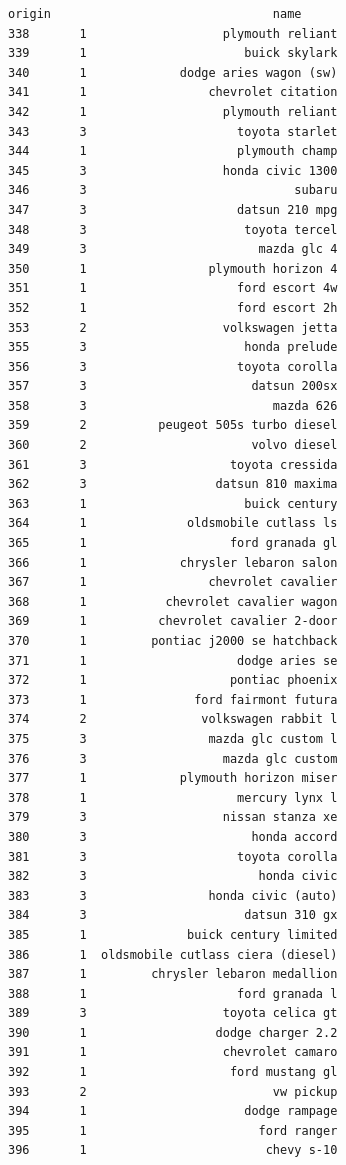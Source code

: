 \documentclass[11pt]{article}
\begin{document}
\begin{tcolorbox}[breakable, size=fbox, boxrule=.5pt, pad at break*=1mm, opacityfill=0]
\begin{Verbatim}[commandchars=\\\{\}]
     origin                               name
338       1                   plymouth reliant
339       1                      buick skylark
340       1             dodge aries wagon (sw)
341       1                 chevrolet citation
342       1                   plymouth reliant
343       3                     toyota starlet
344       1                     plymouth champ
345       3                   honda civic 1300
346       3                             subaru
347       3                     datsun 210 mpg
348       3                      toyota tercel
349       3                        mazda glc 4
350       1                 plymouth horizon 4
351       1                     ford escort 4w
352       1                     ford escort 2h
353       2                   volkswagen jetta
355       3                      honda prelude
356       3                     toyota corolla
357       3                       datsun 200sx
358       3                          mazda 626
359       2          peugeot 505s turbo diesel
360       2                       volvo diesel
361       3                    toyota cressida
362       3                  datsun 810 maxima
363       1                      buick century
364       1              oldsmobile cutlass ls
365       1                    ford granada gl
366       1             chrysler lebaron salon
367       1                 chevrolet cavalier
368       1           chevrolet cavalier wagon
369       1          chevrolet cavalier 2-door
370       1         pontiac j2000 se hatchback
371       1                     dodge aries se
372       1                    pontiac phoenix
373       1               ford fairmont futura
374       2                volkswagen rabbit l
375       3                 mazda glc custom l
376       3                   mazda glc custom
377       1             plymouth horizon miser
378       1                     mercury lynx l
379       3                   nissan stanza xe
380       3                       honda accord
381       3                     toyota corolla
382       3                        honda civic
383       3                 honda civic (auto)
384       3                      datsun 310 gx
385       1              buick century limited
386       1  oldsmobile cutlass ciera (diesel)
387       1         chrysler lebaron medallion
388       1                     ford granada l
389       3                   toyota celica gt
390       1                  dodge charger 2.2
391       1                   chevrolet camaro
392       1                    ford mustang gl
393       2                          vw pickup
394       1                      dodge rampage
395       1                        ford ranger
396       1                         chevy s-10
\end{Verbatim}
\end{tcolorbox}
        
\end{document}
